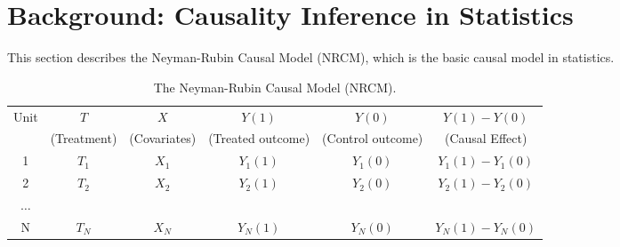 \vspace{-.1cm}
\section{Background: Causality Inference in Statistics}
\label{subsec:causalitystatistics}





This section describes the Neyman-Rubin Causal Model (NRCM),
which is the basic causal model in statistics.

\begin{table*}[t] \scriptsize
  \centering
  \begin{tabular}{|c|c|c|c|c|c|} \hline
    Unit & $T$           & $X$          & $Y(1)$                & $Y(0)$        &  $Y(1)-Y(0)$ \\
         & (Treatment)   & (Covariates) & (Treated outcome)     & (Control outcome)     & (Causal  Effect)\\
    \hline
    1   & $T_1$ & $X_1$ &  $Y_1(1)$ & $Y_1(0)$ & $Y_1(1) - Y_1(0)$ \\
    2   & $T_2$ & $X_2$ &  $Y_2(1)$ & $Y_2(0)$ & $Y_2(1) - Y_2(0)$ \\
$\ldots$&       &       &  & & \\
    N   & $T_N$ & $X_N$ &  $Y_N(1)$ & $Y_N(0)$ & $Y_N(1) - Y_N(0)$ \\ \hline
  \end{tabular}
  \caption{The Neyman-Rubin Causal Model (NRCM).}
  \label{fig:causal:inference}
\end{table*}

